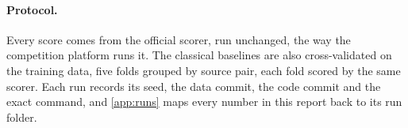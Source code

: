 \paragraph{Protocol.}
Every score comes from the official scorer, run unchanged, the way the competition platform runs it. The classical baselines are also cross-validated on the training data, five folds grouped by source pair, each fold scored by the same scorer. Each run records its seed, the data commit, the code commit and the exact command, and \cref{app:runs} maps every number in this report back to its run folder.
